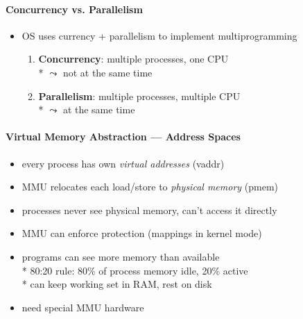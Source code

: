 \paragraph{Concurrency vs. Parallelism}
\begin{itemize}
	\item OS uses currency + parallelism to implement multiprogramming
	\begin{enumerate}
		\item \textbf{Concurrency}: multiple processes, one CPU \\* \( \leadsto \) not at the same time
		\item \textbf{Parallelism}: multiple processes, multiple CPU \\* \( \leadsto \) at the same time
	\end{enumerate}
\end{itemize}

\paragraph{Virtual Memory Abstraction --- Address Spaces}
\begin{itemize}
	\item every process has own \emph{virtual addresses} (vaddr)
	\item MMU relocates each load/store to \emph{physical memory} (pmem)
	\item processes never see physical memory, can't access it directly
	\item \textcolor{black!60!green}{\code{+}} MMU can enforce protection (mappings in kernel mode)
	\item \textcolor{black!60!green}{\code{+}} programs can see more memory than available \\*
		\phantom{x} 80:20 rule: 80\% of process memory idle, 20\% active \\*
		\phantom{x} can keep working set in RAM, rest on disk
	\item \textcolor{red}{\code{-}} need special MMU hardware
\end{itemize}

